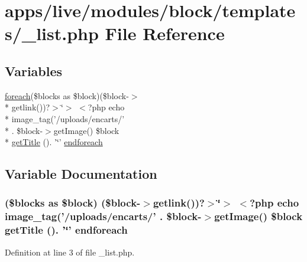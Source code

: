 \hypertarget{live_2modules_2block_2templates_2__list_8php}{\section{apps/live/modules/block/templates/\-\_\-list.php File Reference}
\label{live_2modules_2block_2templates_2__list_8php}
}
\subsection*{Variables}
\begin{DoxyCompactItemize}
\item 
\hyperlink{presse_2modules_2news_2templates_2index_success_8php_abc56db52b2e9a59bcd5c9e45ac5cb332}{foreach}(\$blocks as \$block)(\$block-\/$>$\\*
getlink())?$>$\char`\"{}$>$ $<$?php echo \\*
image\-\_\-tag('/uploads/encarts/' \\*
. \$block-\/$>$get\-Image() \$block \\*
\hyperlink{backend_2modules_2block_2templates_2index_success_8php_a58abfb4a1e6c312e255e475413e1d76d}{get\-Title} (). '\char`\"{}' \hyperlink{live_2modules_2block_2templates_2__list_8php_a419f8fe19f6b8a97018a560554ed326d}{endforeach}
\end{DoxyCompactItemize}


\subsection{Variable Documentation}
\hypertarget{live_2modules_2block_2templates_2__list_8php_a419f8fe19f6b8a97018a560554ed326d}{
\subsubsection[{endforeach}]{ (\$blocks as \$block) (\$block-\/$>$getlink())?$>$\char`\"{}$>$ $<$?php echo image\-\_\-tag('/uploads/encarts/' . \$block-\/$>$get\-Image() \$block {\bf get\-Title} (). '\char`\"{}' endforeach}}\label{live_2modules_2block_2templates_2__list_8php_a419f8fe19f6b8a97018a560554ed326d}


Definition at line 3 of file \-\_\-list.\-php.

